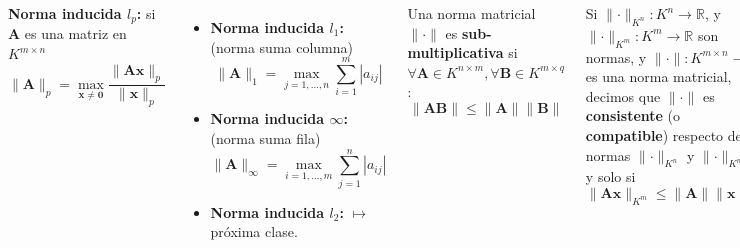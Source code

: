 \documentclass[9pt, aspectratio=169]{beamer}
\begin{document}
\begin{frame}
\begin{columns}[t]
\cx
\textbf{Norma inducida $l_p$:} si $\bm{A}$ es una matriz en $K^{m \times n}$
\[ \lVert \bm{A} \rVert_p = \max_{\bm{x} \neq \bm{0}} \frac{ \lVert \bm{A} \bm{x}\rVert_p }{\lVert \bm{x} \rVert_p} \]
\begin{itemize}
    \item \textbf{Norma inducida $l_1$:} (norma suma columna)
    \[ \lVert \bm{A} \rVert_1 = \max_{j = 1,\ldots, n} \sum_{i=1}^m |a_{ij}| \]
    \item \textbf{Norma inducida ${\infty}$:} (norma suma fila)
        \[ \lVert \bm{A} \rVert_{\infty} = \max_{i = 1,\ldots, m} \sum_{j=1}^n |a_{ij}| \]
    \item \textbf{Norma inducida $l_2$:} $\mapsto$ \alert{próxima clase}.
\end{itemize}
\pause

\cx
\begin{definition}
    Una norma matricial $\lVert \cdot \rVert$ es \textbf{sub-multiplicativa} si $\forall \bm{A} \in K^{n \times m}, \forall \bm{B} \in K^{m \times q}$:
    \[ \lVert \bm{A} \bm{B} \rVert \leq \lVert \bm{A} \rVert \lVert \bm{B} \rVert \]
\end{definition}

\begin{definition}[Consistencia]
    Si $\lVert \cdot \rVert_{K^n} : K^n \rightarrow \mathbb{R}$, y $\lVert \cdot \rVert_{K^m} : K^m \rightarrow \mathbb{R}$ son normas, y $\lVert \cdot \rVert : K^{m \times n} \rightarrow \mathbb{R}$ es una norma matricial, decimos que $\lVert \cdot \rVert$ es \textbf{consistente} (o \textbf{compatible}) respecto de las normas $\lVert \cdot \rVert_{K^n}$ y $\lVert \cdot \rVert_{K^m}$ si y solo si
    \[ \lVert \bm{A} \bm{x} \rVert_{K^m} \leq \lVert \bm{A} \rVert \lVert \bm{x} \rVert_{K^n} \]
\end{definition}
En matrices cuadradas, las normas inducidas son \textbf{sub-multiplicativas} y \textbf{consistentes}.
\end{columns}
\end{frame}
\end{document}
